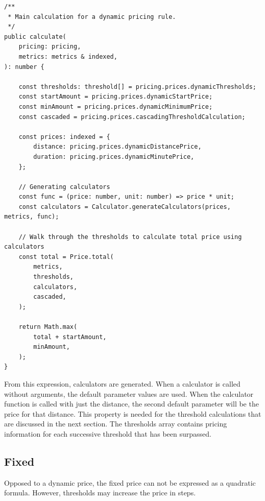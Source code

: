 \begin{center}
\noindent\begin{minipage}{.85\textwidth}
\begin{lstlisting}[caption={Dynamic calculation.}, label={lst:dynamic-calculation}]
/**
 * Main calculation for a dynamic pricing rule.
 */
public calculate(
	pricing: pricing,
	metrics: metrics & indexed,
): number {

	const thresholds: threshold[] = pricing.prices.dynamicThresholds;
	const startAmount = pricing.prices.dynamicStartPrice;
	const minAmount = pricing.prices.dynamicMinimumPrice;
	const cascaded = pricing.prices.cascadingThresholdCalculation;

	const prices: indexed = {
		distance: pricing.prices.dynamicDistancePrice,
		duration: pricing.prices.dynamicMinutePrice,
	};

	// Generating calculators
	const func = (price: number, unit: number) => price * unit;
	const calculators = Calculator.generateCalculators(prices, metrics, func);

	// Walk through the thresholds to calculate total price using calculators
	const total = Price.total(
		metrics,
		thresholds,
		calculators,
		cascaded,
	);

	return Math.max(
		total + startAmount,
		minAmount,
	);
}
\end{lstlisting}
\end{minipage}
\end{center}

From this expression, calculators are generated. When a calculator is called without arguments, the default parameter values are used. When the calculator function is called with just the distance, the second default parameter will be the price for that distance. This property is needed for the threshold calculations that are discussed in the next section. The thresholds array contains pricing information for each successive threshold that has been surpassed.

\subsection{Fixed}
Opposed to a dynamic price, the fixed price can not be expressed as a quadratic formula. However, thresholds may increase the price in steps.

